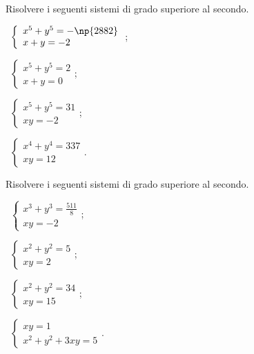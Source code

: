 \begin{esercizio}[\Ast]
 \label{ese:6.31}
Risolvere i seguenti sistemi di grado superiore al secondo.
\begin{multicols}{2}
 \begin{enumeratea}
 \item~$\left\{\begin{array}{l}x^5+y^5=-\np{2882}\\x+y=-2\end{array}\right.$;
 \item~$\left\{\begin{array}{l}x^5+y^5=2\\x+y=0\end{array}\right.$;
 \item~$\left\{\begin{array}{l}x^5+y^5=31\\xy=-2\end{array}\right.$;
 \item~$\left\{\begin{array}{l}x^4+y^4=337\\xy=12\end{array}\right.$.
 \end{enumeratea}
 \end{multicols}
\end{esercizio}
\pagebreak
\begin{esercizio}[\Ast]
 \label{ese:6.32}
Risolvere i seguenti sistemi di grado superiore al secondo.
\begin{multicols}{2}
 \begin{enumeratea}
 \item~$\left\{\begin{array}{l}x^3+y^3=\frac{511} 8\\xy=-2\end{array}\right.$;
 \item~$\left\{\begin{array}{l}x^2+y^2=5\\xy=2 \end{array}\right.$;
 \item~$\left\{\begin{array}{l}x^2+y^2=34\\xy=15 \end{array}\right.$;
 \item~$\left\{\begin{array}{l}xy=1 \\x^2+y^2+3xy=5\end{array}\right.$.
 \end{enumeratea}
 \end{multicols}
\end{esercizio}

